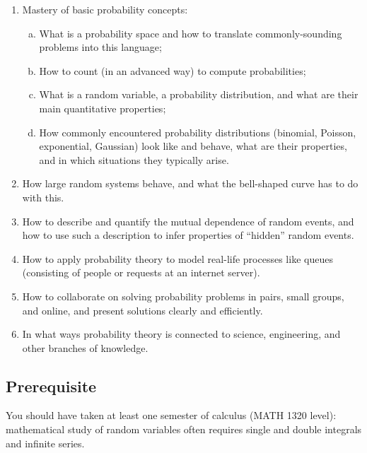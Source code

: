 \documentclass[oneside,11pt]{amsart}
\begin{document}
\begin{enumerate}[\bf{}1.]
	\item Mastery of basic probability concepts:
	\begin{enumerate}[(a)]
		\item What is a probability space and how to translate commonly-sounding problems into this language;
		\item How to count (in an advanced way) to compute probabilities;
		\item What is a random variable, a probability distribution,
		and what are their main quantitative properties;
		\item 
		How commonly encountered probability 
		distributions (binomial, Poisson, exponential, Gaussian) look like and behave,
		what are 
		their properties, and in which situations they typically arise.
	\end{enumerate}

	\item How large random systems behave, and what the 
	bell-shaped curve
	has to do with this.
	\item How to describe and quantify the mutual dependence of random events,
	and how to use such a description 
	to infer properties of ``hidden'' random events.
	\item How to apply probability theory to model real-life processes like queues
	(consisting of people or requests at an internet server).
	\item How to collaborate on solving probability problems in pairs, small groups, and online,
	and present solutions clearly and efficiently.
	\item In what ways probability theory is connected to science,
	engineering, and other branches of knowledge.
\end{enumerate}

\subsection*{Prerequisite} You should have taken at least one semester of calculus (MATH 1320 level):
mathematical study of random variables often requires single and double integrals
and infinite series.
\end{document}
